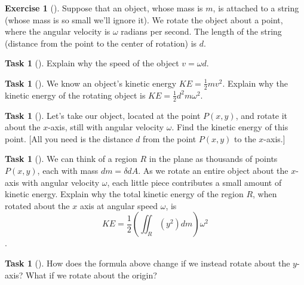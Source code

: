 \documentclass[10pt,]{book}
\theoremstyle{plain}
\theoremstyle{definition}
\theoremstyle{definition}
\theoremstyle{definition}
\theoremstyle{definition}
\newtheorem{exploration}[project]{Exercise}
\newtheorem{task}[project]{Task}
\theoremstyle{definition}
\numberwithin{equation}{section}
\begin{document}
\begin{exploration}[]\label{exploration-262}
Suppose that an object, whose mass is \(m\), is attached to a string (whose mass is so small we'll ignore it). We rotate the object about a point, where the angular velocity is \(\omega\) radians per second. The length of the string (distance from the point to the center of rotation) is \(d\).%
\begin{task}[]\label{task-709}
Explain why the speed of the object \(v=\omega d\).%
\end{task}
\begin{task}[]\label{task-710}
We know an object's kinetic energy \(KE=\frac{1}{2}mv^2\). Explain why the kinetic energy of the rotating object is \(KE = \frac{1}{2}d^2m\omega^2\).%
\end{task}
\begin{task}[]\label{task-711}
Let's take our object, located at the point \(P(x,y)\), and rotate it about the \(x\)-axis, still with angular velocity \(\omega\). Find the kinetic energy of this point. [All you need is the distance \(d\) from the point \(P(x,y)\) to the \(x\)-axis.]%
\end{task}
\begin{task}[]\label{task-712}
We can think of a region \(R\) in the plane as thousands of points \(P(x,y)\), each with mass \(dm=\delta dA\). As we rotate an entire object about the \(x\)-axis with angular velocity \(\omega\), each little piece contributes a small amount of kinetic energy. Explain why the total kinetic energy of the region \(R\), when rotated about the \(x\) axis at angular speed \(\omega\), is %
\begin{equation*}
KE= \frac{1}{2}\left(\iint_R (y^2)dm\right)\omega^2
\end{equation*}
.%
\end{task}
\begin{task}[]\label{task-713}
How does the formula above change if we instead rotate about the \(y\)-axis? What if we rotate about the origin? %
\end{task}
\end{exploration}
\typeout{************************************************}
\typeout{************************************************}
\end{document}
